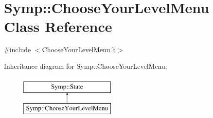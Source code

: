 \hypertarget{class_symp_1_1_choose_your_level_menu}{\section{Symp\-:\-:Choose\-Your\-Level\-Menu Class Reference}
\label{class_symp_1_1_choose_your_level_menu}
}


{\ttfamily \#include $<$Choose\-Your\-Level\-Menu.\-h$>$}

Inheritance diagram for Symp\-:\-:Choose\-Your\-Level\-Menu\-:\begin{figure}[H]
\begin{center}
\leavevmode
\includegraphics[height=2.000000cm]{class_symp_1_1_choose_your_level_menu}
\end{center}
\end{figure}
